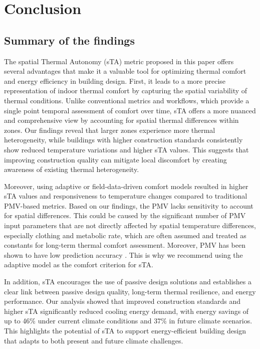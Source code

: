

\section{Conclusion}

\subsection{Summary of the findings}

The spatial Thermal Autonomy (sTA) metric proposed in this paper offers several advantages that make it a valuable tool for optimizing thermal comfort and energy efficiency in building design. First, it leads to a more precise representation of indoor thermal comfort by capturing the spatial variability of thermal conditions. Unlike conventional metrics and workflows, which provide a single point temporal assessment of comfort over time, sTA offers a more nuanced and comprehensive view by accounting for spatial thermal differences within zones. Our findings reveal that larger zones experience more thermal heterogeneity, while buildings with higher construction standards consistently show reduced temperature variations and higher sTA values. This suggests that improving construction quality can mitigate local discomfort by creating awareness of existing thermal heterogeneity.

Moreover, using adaptive or field-data-driven comfort models resulted in higher sTA values and responsiveness to temperature changes compared to traditional PMV-based metrics. Based on our findings, the PMV lacks sensitivity to account for spatial differences. This could be caused by the significant number of PMV input parameters that are not directly affected by spatial temperature differences, especially clothing and metabolic rate, which are often assumed and treated as constants for long-term thermal comfort assessment. Moreover, PMV has been shown to have low prediction accuracy \citep{cheung_analysis_2019}. This is why we recommend using the adaptive model as the comfort criterion for sTA.

In addition, sTA encourages the use of passive design solutions and establishes a clear link between passive design quality, long-term thermal resilience, and energy performance. Our analysis showed that improved construction standards and higher sTA significantly reduced cooling energy demand, with energy savings of up to 46\% under current climate conditions and 37\% in future climate scenarios. This highlights the potential of sTA to support energy-efficient building design that adapts to both present and future climate challenges. 

